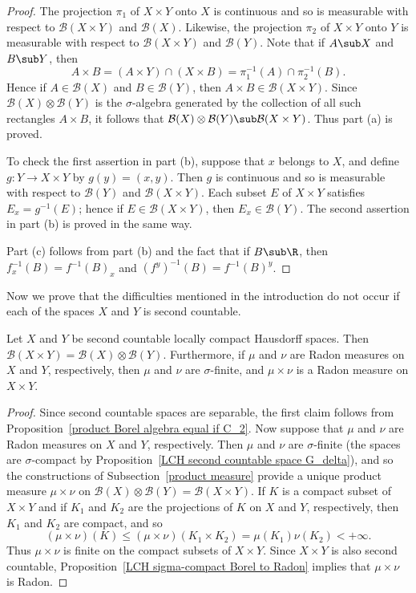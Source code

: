 \begin{proof}
The projection $\pi_1$ of $X\times Y$ onto $X$ is continuous and so is measurable with respect to $\mathcal{B}(X\times Y)$ and $\mathcal{B}(X)$. Likewise, the projection $\pi_2$ of $X\times Y$ onto $Y$ is measurable with respect to $\mathcal{B}(X\times Y)$ and $\mathcal{B}(Y)$. Note that if $A\sub X$ and $B\sub Y$, then
\[A\times B=(A\times Y)\cap(X\times B)=\pi_1^{-1}(A)\cap\pi_2^{-1}(B).\]
Hence if $A\in\mathcal{B}(X)$ and $B\in\mathcal{B}(Y)$, then $A\times B\in\mathcal{B}(X\times Y)$. Since $\mathcal{B}(X)\otimes\mathcal{B}(Y)$ is the $\sigma$-algebra generated by the collection of all such rectangles $A\times B$, it follows that $\mathcal{B}(X)\otimes\mathcal{B}(Y)\sub\mathcal{B}(X\times Y)$. Thus part (a) is proved.\par
To check the first assertion in part (b), suppose that $x$ belongs to $X$, and define $g:Y\to X\times Y$ by $g(y)=(x,y)$. Then $g$ is continuous and so is measurable with respect to $\mathcal{B}(Y)$ and $\mathcal{B}(X\times Y)$. Each subset $E$ of $X\times Y$ satisfies $E_x=g^{-1}(E)$; hence if $E\in\mathcal{B}(X\times Y)$, then $E_x\in\mathcal{B}(Y)$. The second assertion in part (b) is proved in the same way.\par
Part (c) follows from part (b) and the fact that if $B\sub\R$, then $f_x^{-1}(B)=f^{-1}(B)_x$ and $(f^y)^{-1}(B)=f^{-1}(B)^y$.
\end{proof}
Now we prove that the difficulties mentioned in the introduction do not occur if each of the spaces $X$ and $Y$ is second countable.
\begin{proposition}\label{LCH product Radon measure}
Let $X$ and $Y$ be second countable locally compact Hausdorff spaces. Then $\mathcal{B}(X\times Y)=\mathcal{B}(X)\otimes\mathcal{B}(Y)$. Furthermore, if $\mu$ and $\nu$ are Radon measures on $X$ and $Y$, respectively, then $\mu$ and $\nu$ are $\sigma$-finite, and $\mu\times\nu$ is a Radon measure on $X\times Y$.
\end{proposition}
\begin{proof}
Since second countable spaces are separable, the first claim follows from Proposition~\ref{product Borel algebra equal if C_2}. Now suppose that $\mu$ and $\nu$ are Radon measures on $X$ and $Y$, respectively. Then $\mu$ and $\nu$ are $\sigma$-finite (the spaces are $\sigma$-compact by Proposition~\ref{LCH second countable space G_delta}), and so the constructions of Subsection~\ref{product measure} provide a unique product measure $\mu\times\nu$ on $\mathcal{B}(X)\otimes\mathcal{B}(Y)=\mathcal{B}(X\times Y)$. If $K$ is a compact subset of $X\times Y$ and if $K_1$ and $K_2$ are the projections of $K$ on $X$ and $Y$, respectively, then $K_1$ and $K_2$ are compact, and so 
\[(\mu\times\nu)(K)\leq(\mu\times\nu)(K_1\times K_2)=\mu(K_1)\nu(K_2)<+\infty.\]
Thus $\mu\times\nu$ is finite on the compact subsets of $X\times Y$. Since $X\times Y$ is also second countable, Proposition~\ref{LCH sigma-compact Borel to Radon} implies that $\mu\times\nu$ is Radon.
\end{proof}
